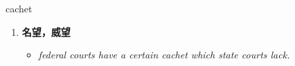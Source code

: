 
\begin{frame}
{\huge cachet}
\begin{center}
\begin{enumerate}\Large
  \item \textbf{名望，威望}
  \begin{itemize}
    \item \em{\Large{federal courts have a certain cachet which state courts lack.}}
  \end{itemize}
\end{enumerate}
\end{center}
\end{frame}
